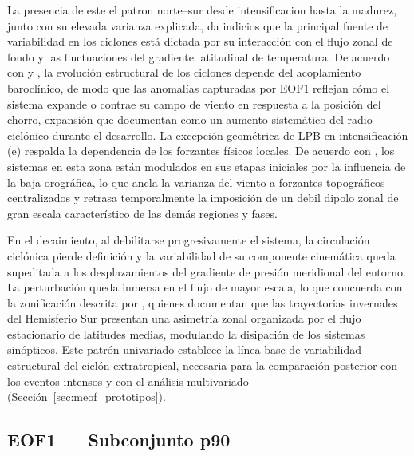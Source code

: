 La presencia de este el patron norte--sur desde intensificacion hasta la madurez, junto con su elevada varianza explicada, da indicios que la principal fuente de variabilidad en los ciclones está dictada por su interacción con el flujo zonal de fondo y las fluctuaciones del gradiente latitudinal de temperatura. 
De acuerdo con \citet{hoskins2005new} y \citet{dossantos2023response}, la evolución estructural de los ciclones depende del acoplamiento baroclínico, de modo que las anomalías capturadas por EOF1 reflejan cómo el sistema expande o contrae su campo de viento en respuesta a la posición del chorro, expansión que \citet{simmonds2000size} documentan como un aumento sistemático del radio ciclónico durante el desarrollo.
La excepción geométrica de LPB en intensificación (e) respalda la dependencia de los forzantes físicos locales. 
De acuerdo con \citet{gramcianinov2019properties}, los sistemas en esta zona están modulados en sus etapas iniciales por la influencia de la baja orográfica, lo que ancla la varianza del viento a forzantes topográficos centralizados y retrasa temporalmente la imposición de un debil dipolo zonal de gran escala característico de las demás regiones y fases.

En el decaimiento, al debilitarse progresivamente el sistema, la circulación ciclónica pierde definición y la variabilidad de su componente cinemática queda supeditada a los desplazamientos del gradiente de presión meridional del entorno. 
La perturbación queda inmersa en el flujo de mayor escala, lo que concuerda con la zonificación descrita por \citet{inatsu2004zonal}, quienes documentan que las trayectorias invernales del Hemisferio Sur presentan una asimetría zonal organizada por el flujo estacionario de latitudes medias, modulando la disipación de los sistemas sinópticos.
Este patrón univariado establece la línea base de variabilidad estructural del ciclón extratropical, necesaria para la comparación posterior con los eventos intensos y con el análisis multivariado (Sección~\ref{sec:meof_prototipos}).
\subsection{EOF1 --- Subconjunto p90}\label{subsec:eof1_wind10_p90}

